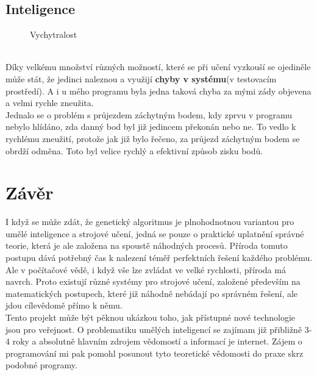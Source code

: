 \documentclass[a4paper,12pt]{article}
\newcommand{\tab}
{
    \hspace*{1em}
}
\begin{document}
        \vspace{-2em}
        \subsection{Inteligence}
            \hfill
            \vspace{-2em}
            \begin{figure}
                \centering
                \caption{Vychytralost} 
                \label{fig:intel}
            \end{figure}
            \\
            \tab Díky velkému množství různých možností, které se při učení vyzkouší se ojediněle může stát,
            že jedinci naleznou a využijí \textbf{chyby v systému}(v testovacím prostředí). 
            A i u mého programu byla jedna taková chyba za mými zády objevena a velmi rychle zneužita.\\
            Jednalo se o problém s průjezdem záchytným bodem, kdy zprvu v programu nebylo hlídáno, zda danný 
            bod byl již jedincem překonán nebo ne. To vedlo k rychlému zneužití, protože jak již bylo řečeno,
            za průjezd záchytným bodem se obrdží odměna. Toto byl velice rychlý a efektivní způsob zisku bodů.

    \section{Závěr}
        \tab I když se může zdát, že genetický algoritmus je plnohodnotnou variantou pro umělé inteligence
        a strojové učení, jedná se pouze o praktické uplatnění správné teorie, která je ale založena na spoustě náhodných procesů.
        Příroda tomuto postupu dává potřebný čas k nalezení téměř perfektních řešení každého problému.
        Ale v počítačové vědě, i když vše lze zvládat ve velké rychlosti, příroda má navrch.
        Proto existují různé systémy pro strojové učení, založené především na matematických postupech,
        které již náhodně nebádají po správném řešení, ale jdou cílevědomě přímo k němu.\\
        \tab Tento projekt může být pěknou ukázkou toho, jak přístupné nové technologie jsou pro veřejnost.
        O problematiku umělých inteligencí se zajímam již přibližně 3-4 roky a absolutně
        hlavním zdrojem vědomostí a informací je internet. Zájem o programování mi pak pomohl 
        posunout tyto teoretické vědomosti do praxe skrz podobné programy.
\end{document}

